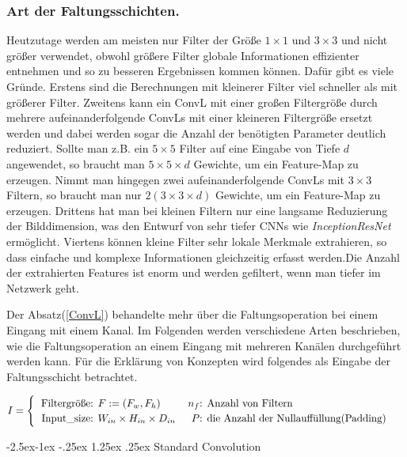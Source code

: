 \documentclass[12pt,a4paper]{scrartcl}
\makeatletter
\numberwithin{equation}{section}
\renewcommand\paragraph{\@startsection{paragraph}{4}{\z@}%
	{-2.5ex\@plus -1ex \@minus -.25ex}%
	{1.25ex \@plus .25ex}%
	{\normalfont\normalsize\bfseries}}
\makeatother
\begin{document}
\subsubsection{Art der Faltungsschichten.}
Heutzutage werden am meisten nur Filter der Größe $ 1\times 1 $ und $ 3\times 3 $ und nicht größer verwendet, obwohl größere Filter globale Informationen effizienter entnehmen und so zu besseren Ergebnissen kommen können. Dafür gibt es viele Gründe. Erstens sind die Berechnungen mit kleinerer Filter viel schneller als mit größerer Filter. Zweitens kann ein \ac{ConvL} mit einer großen Filtergröße durch mehrere aufeinanderfolgende \acsp{ConvL} mit einer kleineren Filtergröße ersetzt werden und dabei werden sogar die Anzahl der benötigten Parameter deutlich reduziert. Sollte man z.B. ein $ 5\times 5 $ Filter auf eine Eingabe von Tiefe $ d $ angewendet, so braucht man $ 5\times 5\times d $ Gewichte, um ein Feature-Map zu erzeugen. Nimmt man hingegen zwei aufeinanderfolgende \acsp{ConvL} mit $ 3\times 3$ Filtern, so braucht man nur $ 2(3\times 3\times d) $ Gewichte, um ein Feature-Map zu erzeugen. Drittens hat man bei kleinen Filtern nur eine langsame Reduzierung der Bilddimension, was den Entwurf von sehr tiefer \ac{CNN}s wie \textit{InceptionResNet} ermöglicht. Viertens können kleine Filter sehr lokale Merkmale extrahieren, so dass einfache und komplexe Informationen gleichzeitig erfasst werden.Die Anzahl der extrahierten Features ist enorm und werden gefiltert, wenn man tiefer im Netzwerk geht.

Der Absatz(\ref{ConvL}) behandelte mehr über die Faltungsoperation bei einem Eingang mit einem Kanal. Im Folgenden werden verschiedene Arten beschrieben, wie die Faltungsoperation an einem Eingang mit mehreren Kanälen durchgeführt werden kann. Für die Erklärung von Konzepten wird folgendes als Eingabe der Faltungsschicht betrachtet.

 \[ I=\begin{cases}

 \begin{tabular}{r@{: }l r@{: }l}
 Filtergröße& $ F:=(F_w, F_h) $  & 	$ n_{f}$& Anzahl von Filtern\\
 Input\_{size}& $ W_{in}\times H_{in}\times D_{in} $ & $ P $ & die Anzahl der Nullauffüllung(Padding)
 \end{tabular}
 
 \end{cases}\]

\paragraph{Standard Convolution}\label{CONV}
\end{document}
